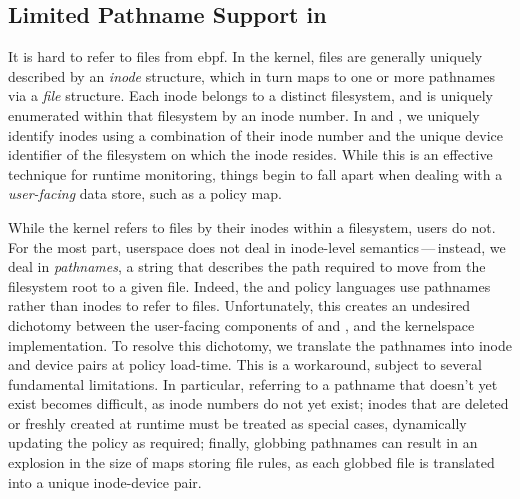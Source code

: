 \subsection{Limited Pathname Support in }

It is hard to refer to files from \gls{ebpf}. In the kernel, files are generally uniquely
described by an \textit{inode} structure, which in turn maps to one or more pathnames via
a \textit{file} structure. Each inode belongs to a distinct filesystem, and is uniquely
enumerated within that filesystem by an inode number.  In \bpfbox{} and \bpfcontain{}, we
uniquely identify inodes using a combination of their inode number and the unique device
identifier of the filesystem on which the inode resides. While this is an effective
technique for runtime monitoring, things begin to fall apart when dealing with
a \textit{user-facing} data store, such as a policy map.

While the kernel refers to files by their inodes within a filesystem, users do not. For
the most part, userspace does not deal in inode-level semantics\,---\,instead, we deal in
\textit{pathnames}, a string that describes the path required to move from the filesystem
root to a given file. Indeed, the \bpfbox{} and \bpfcontain{} policy languages use
pathnames rather than inodes to refer to files. Unfortunately, this creates an undesired
dichotomy between the user-facing components of \bpfbox{} and \bpfcontain{}, and the
kernelspace implementation.  To resolve this dichotomy, we translate the pathnames into
inode and device pairs at policy load-time. This is a workaround, subject to several
fundamental limitations. In particular, referring to a pathname that doesn't yet exist
becomes difficult, as inode numbers do not yet exist; inodes that are deleted or freshly
created at runtime must be treated as special cases, dynamically updating the policy as
required; finally, globbing pathnames can result in an explosion in the size of maps
storing file rules, as each globbed file is translated into a unique inode-device pair.

